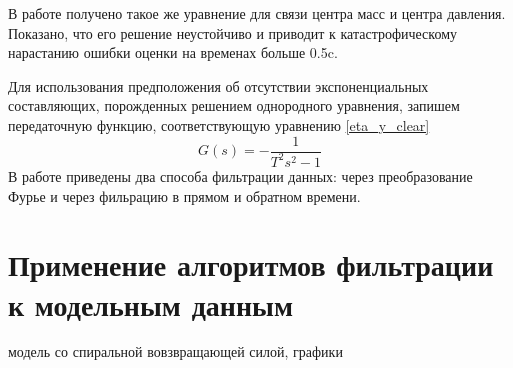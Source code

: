 \documentclass[a4paper,12pt, openany]{book}
\theoremstyle{plain} %
\theoremstyle{definition} %
\theoremstyle{remark} %
\numberwithin{equation}{chapter}
\begin{document}
{В работе \cite{kruchPodoprihin} получено такое же уравнение для связи центра масс и центра давления. Показано, что его решение неустойчиво и приводит к катастрофическому нарастанию ошибки оценки на временах больше 0.5c.

Для использования предположения об отсутствии экспоненциальных составляющих, порожденных решением однородного уравнения, запишем передаточную функцию, соответствующую
уравнению \eqref{eta_y_clear}
\[
    G(s)=-\dfrac{1}{T^2s^2-1}
\]
В работе \cite{kruchPodoprihin} приведены два способа фильтрации данных: через преобразование Фурье и через фильрацию в прямом и обратном времени.

\section{Применение алгоритмов фильтрации к модельным данным}
модель со спиральной вовзвращающей силой, графики

}
\end{document}

